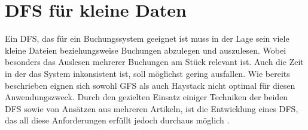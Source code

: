 \documentclass[12pt,oneside,a4paper,parskip]{scrbook}
\begin{document}
\section{DFS für kleine Daten}
\label{oneOnlyDFS}
Ein DFS, das für ein Buchungssystem geeignet ist muss in der Lage sein viele kleine Dateien beziehungsweise Buchungen abzulegen und auszulesen. Wobei besonders das Auslesen mehrerer Buchungen am Stück relevant ist. Auch die Zeit in der das System inkonsistent ist, soll möglichst gering ausfallen. Wie bereits beschrieben eignen sich sowohl GFS als auch Haystack nicht optimal für diesen Anwendungszweck. Durch den gezielten Einsatz einiger Techniken der beiden DFS sowie von Ansätzen aus mehreren Artikeln, ist die Entwicklung eines DFS, das all diese Anforderungen erfüllt jedoch durchaus möglich \cite{hdfsSmallFiles}\cite{hadoopSmallFiles2}\cite{smallFilesHDFS3}.
\end{document}
